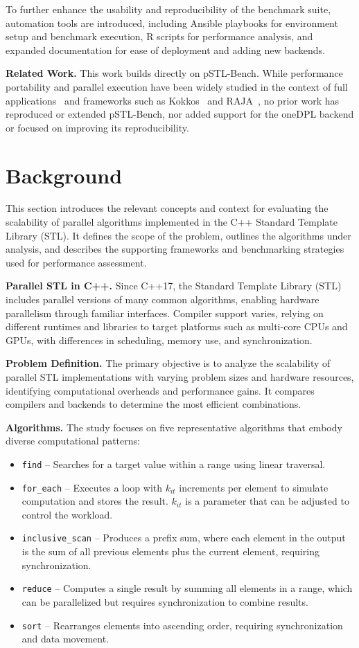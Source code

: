 \documentclass[sigconf]{acmart}
\newcommand{\mypar}[1]{{\bf #1.}}
\begin{document}
To further enhance the usability and reproducibility of the benchmark suite,
automation tools are introduced, including Ansible playbooks for environment
setup and benchmark execution, R scripts for performance analysis, and expanded
documentation for ease of deployment and adding new backends.

\mypar{Related Work} This work builds directly on pSTL-Bench.
While performance portability and parallel execution have been widely studied in
the context of full applications~\cite{app} and frameworks such as Kokkos~\cite{Kokkos}
and RAJA~\cite{RAJA}, no prior work has reproduced or extended pSTL-Bench,
nor added support for the oneDPL backend or focused on improving its reproducibility.

\section{Background}\label{sec:background}
This section introduces the relevant concepts and context for evaluating the
scalability of parallel algorithms implemented in the C++ Standard Template
Library (STL). It defines the scope of the problem, outlines the algorithms
under analysis, and describes the supporting frameworks and benchmarking
strategies used for performance assessment.

\mypar{Parallel STL in C++} Since C++17, the Standard Template Library (STL) includes parallel versions
of many common algorithms, enabling hardware parallelism through
familiar interfaces. Compiler support varies, relying on different
runtimes and libraries to target platforms such as multi-core CPUs
and GPUs, with differences in scheduling, memory use, and synchronization.

\mypar{Problem Definition} The primary objective is to analyze the scalability of parallel STL
implementations with varying problem sizes and hardware resources, identifying computational overheads
and performance gains. It compares compilers and backends to determine the most efficient combinations.

\mypar{Algorithms} The study focuses on five representative algorithms that embody diverse computational patterns:
\begin{itemize}
      \item \texttt{find} – Searches for a target value within a range using linear traversal.
      \item \texttt{for\_each} – Executes a loop with $k_{it}$ increments per element to simulate computation and stores the result.
            $k_{it}$ is a parameter that can be adjusted to control the workload.
      \item \texttt{inclusive\_scan} – Produces a prefix sum, where each element in the output is the sum of all previous elements
            plus the current element, requiring synchronization.
      \item \texttt{reduce} – Computes a single result by summing all elements in a range, which can be parallelized
            but requires synchronization to combine results.
      \item \texttt{sort} – Rearranges elements into ascending order, requiring synchronization and data movement.
\end{itemize}
\end{document}
